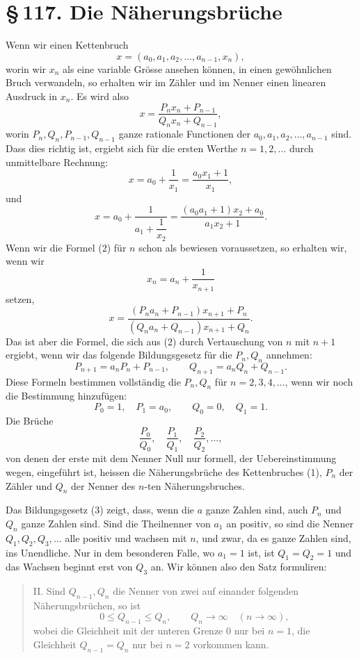 \documentclass[11pt]{article}
\providecommand{\sect}[2]{\section*{\S\,#1. #2}}
\begin{document}
\sect{117}{Die Näherungsbrüche}

Wenn wir einen Kettenbruch
\[
\tag{1}        x=(a_0,a_1,a_2,\ldots,a_{n-1},x_n),
\]
worin wir $x_n$ als eine variable Grösse ansehen können, in einen gewöhnlichen Bruch verwandeln, so erhalten wir im Zähler und im Nenner einen linearen Ausdruck in $x_n$. Es wird also
\[
\tag{2}        x=\frac{P_nx_n+P_{n-1}}{Q_nx_n+Q_{n-1}},
\]
worin $P_n,Q_n,P_{n-1},Q_{n-1}$ ganze rationale Functionen der $a_0,a_1,a_2,\ldots,a_{n-1}$ sind. Dass dies richtig ist, ergiebt sich für die ersten Werthe $n=1,2,\ldots$ durch unmittelbare Rechnung:
\[
 x=a_0+\frac1{x_1}=\frac{a_0x_1+1}{x_1},
\]
und
\[
 x=a_0+\frac1{a_1+\dfrac1{x_2}}
  =\frac{(a_0a_1+1)x_2+a_0}{a_1x_2+1}.
\]
Wenn wir die Formel (2) für $n$ schon als bewiesen voraussetzen, so erhalten wir, wenn wir
\[
        x_n=a_n+\frac1{x_{n+1}}
\]
setzen,
\[
 x=\frac{(P_na_n+P_{n-1})x_{n+1}+P_n}
        {(Q_na_n+Q_{n-1})x_{n+1}+Q_n}.
\]
Das ist aber die Formel, die sich aus (2) durch Vertauschung von $n$ mit $n+1$ ergiebt, wenn wir das folgende Bildungsgesetz für die $P_n,Q_n$ annehmen:
\[
\tag{3}        P_{n+1}=a_nP_n+P_{n-1},\qquad
               Q_{n+1}=a_nQ_n+Q_{n-1}.
\]
Diese Formeln bestimmen vollständig die $P_n,Q_n$ für $n=2,3,4,\ldots$, wenn wir noch die Bestimmung hinzufügen:
\[
\tag{4}        P_0=1,\quad P_1=a_0,\qquad
               Q_0=0,\quad Q_1=1.
\]
Die Brüche
\[
        \frac{P_0}{Q_0},\quad \frac{P_1}{Q_1},\quad \frac{P_2}{Q_2},\ldots,
\]
von denen der erste mit dem Nenner Null nur formell, der Uebereinstimmung wegen, eingeführt ist, heissen die Näherungsbrüche des Kettenbruches (1), $P_n$ der Zähler und $Q_n$ der Nenner des $n$-ten Näherungsbruches.

Das Bildungsgesetz (3) zeigt, dass, wenn die $a$ ganze Zahlen sind, auch $P_n$ und $Q_n$ ganze Zahlen sind. Sind die Theilnenner von $a_1$ an positiv, so sind die Nenner $Q_1,Q_2,Q_3,\ldots$ alle positiv und wachsen mit $n$, und zwar, da es ganze Zahlen sind, ins Unendliche. Nur in dem besonderen Falle, wo $a_1=1$ ist, ist $Q_1=Q_2=1$ und das Wachsen beginnt erst von $Q_3$ an. Wir können also den Satz formuliren:

\begin{quote}
II. Sind $Q_{n-1},Q_n$ die Nenner von zwei auf einander folgenden Näherungsbrüchen, so ist
\[
        0\le Q_{n-1}\le Q_n,\qquad Q_n\to\infty\quad(n\to\infty),
\]
wobei die Gleichheit mit der unteren Grenze $0$ nur bei $n=1$, die Gleichheit $Q_{n-1}=Q_n$ nur bei $n=2$ vorkommen kann.
\end{quote}
\end{document}
